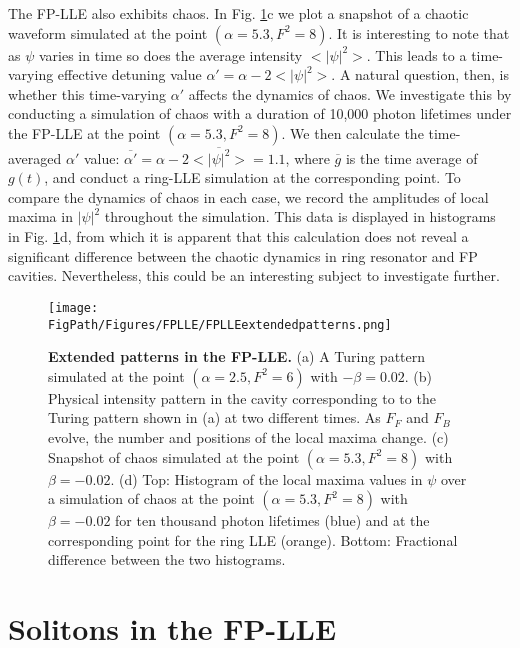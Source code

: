 The FP-LLE also exhibits chaos. In Fig. \ref{fig:FPLLEextendedpatterns}c we plot a snapshot of a chaotic waveform simulated at the point $(\alpha=5.3, F^2=8)$. It is interesting to note that as $\psi$ varies in time so does the average intensity $<|\psi|^2>$. This leads to a time-varying effective detuning value $\alpha'=\alpha-2<|\psi|^2>$. A natural question, then, is whether this time-varying $\alpha'$ affects the dynamics of chaos. We investigate this by conducting a simulation of chaos with a duration of 10,000 photon lifetimes under the FP-LLE at the point $(\alpha=5.3, F^2=8)$. We then calculate the time-averaged $\alpha'$ value: $\overline{\alpha'}=\alpha-2\overline{<|\psi|^2>}=1.1$, where $\overline{g}$ is the time average of $g(t)$, and conduct a ring-LLE simulation at the corresponding point. To compare the dynamics of chaos in each case, we record the amplitudes of local maxima in $|\psi|^2$ throughout the simulation. This data is displayed in histograms in Fig. \ref{fig:FPLLEextendedpatterns}d, from which it is apparent that this calculation does not reveal a significant difference between the chaotic dynamics in ring resonator and FP cavities. Nevertheless, this could be an interesting subject to investigate further. 


\begin{figure}[htpb]
	\begin{center}
		\texttt{[image: \\FigPath/Figures/FPLLE/FPLLEextendedpatterns.png]}
	\end{center}
	\caption[Extended patterns in the FP-LLE]{\textbf{Extended patterns in the FP-LLE.} (a) A Turing pattern simulated at the point $(\alpha=2.5,F^2=6)$ with $-\beta=0.02$. (b) Physical intensity pattern in the cavity corresponding to to the Turing pattern shown in (a) at two different times. As $F_F$ and $F_B$ evolve, the number and positions of the local maxima change. (c) Snapshot of chaos simulated at the point $(\alpha=5.3,F^2=8)$ with $\beta=-0.02$. (d) Top: Histogram of the local maxima values in $\psi$ over a simulation of chaos at the point $(\alpha=5.3,F^2=8)$ with $\beta=-0.02$ for ten thousand photon lifetimes (blue) and at the corresponding point for the ring LLE (orange). Bottom: Fractional difference between the two histograms.}
	\label{fig:FPLLEextendedpatterns}
\end{figure} 

\section{Solitons in the FP-LLE}


